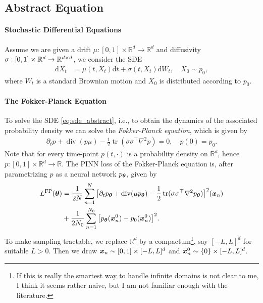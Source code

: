 \subsection{Abstract Equation}
\paragraph{Stochastic Differential Equations}
Assume we are given a drift $\mu:[0,1]\times \mathbb R^d\to\mathbb R^d$ and diffusivity $\sigma:[0,1] \times {\mathbb{R}}^d \to \mathbb R^{d\times d}$, we consider the SDE
\begin{align}\label{eq:sde_abstract}
    \mathrm dX_t
    &=
    \mu(t, X_t)\mathrm d t
    +
    \sigma(t, X_t) \mathrm d W_t,
    \quad 
    X_0 \sim p_0,
\end{align}
where $W_t$ is a standard Brownian motion and $X_0$ is distributed according to $p_0$. 

\paragraph{The Fokker-Planck Equation}
To solve the SDE \eqref{eq:sde_abstract}, i.e., to obtain the dynamics of the associated probability density we can solve the \emph{Fokker-Planck equation}, which is given by
\begin{align}\label{eq:fokker_planck_abstract}
    \partial_t p
    +
    \operatorname{div}(p\mu)
    -
    \frac12 \operatorname{tr}(\sigma \sigma^\top\nabla^2 p)
    =
    0,
    \quad
    p(0) = p_0.
\end{align}
Note that for every time-point $p(t,\cdot)$ is a probability density on $\mathbb R^d$, hence $p:[0,1]\times\mathbb R^d \to \mathbb R$. The PINN loss of the Fokker-Planck equation is, after parametrizing $p$ as a neural network $p_{{\bm{\theta}}}$, given by
\begin{align*}
    L^{\textrm{FP}}({\bm{\theta}})
    &=
    \frac{1}{2N}
    \sum_{n=1}^{N}
    \big[
    \partial_t p_{{\bm{\theta}}}
    +
    \operatorname{div}(\mu p_{{\bm{\theta}}})
    -
    \frac12 \operatorname{tr}(\sigma\sigma^\top\nabla^2 p_{{\bm{\theta}}})
    \big]^2
    ({\bm{x}}_n)
    \\
    &+
    \frac{1}{2 N_0}
    \sum_{n=1}^{N_0}
    \big[
    p_{{\bm{\theta}}}({\bm{x}}_n^0) - p_0({\bm{x}}_n^0)
    \big]^2.
\end{align*}
To make sampling tractable, we replace $\mathbb R^d$ by a compactum\footnote{If this is really the smartest way to handle infinite domains is not clear to me, I think it seems rather naive, but I am not familiar enough with the literature.}, say $[-L, L]^d$ for suitable $L>0$. Then we draw ${\bm{x}}_n \sim [0, 1] \times [-L, L]^d$ and ${\bm{x}}_n^0 \sim \{0\} \times [-L, L]^d$.

